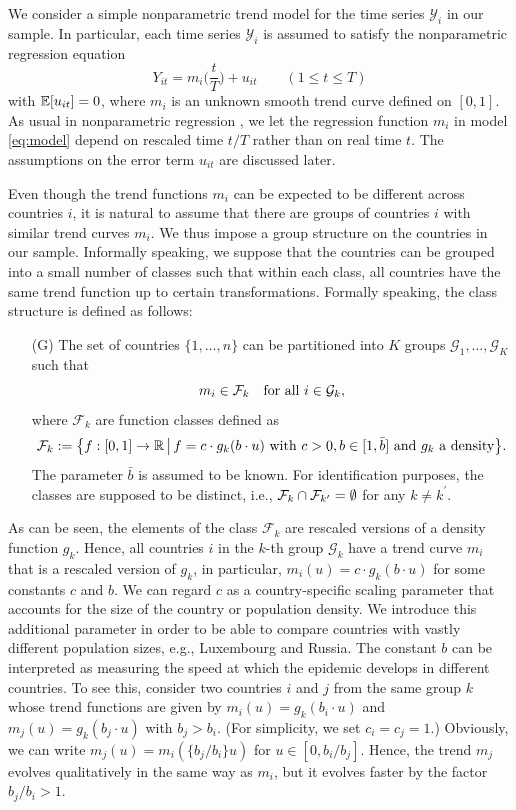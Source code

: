 \documentclass[a4paper,12pt]{article}
\numberwithin{equation}{section}
\begin{document}
We consider a simple nonparametric trend model for the time series $\mathcal{Y}_i$ in our sample. In particular, each time series $\mathcal{Y}_i$ is assumed to satisfy the nonparametric regression equation
\begin{equation}\label{eq:model}
Y_{it} = m_i\Big(\frac{t}{T}\Big) + u_{it} \qquad (1 \le t \le T) 
\end{equation}
with $\mathbb{E}[u_{it}]= 0$, where $m_i$ is an unknown smooth trend curve defined on $[0,1]$. As usual in nonparametric regression \citep[see e.g.][]{Robinson1989}, we let the regression function $m_i$ in model \eqref{eq:model} depend on rescaled time $t/T$ rather than on real time $t$. The assumptions on the error term $u_{it}$ are discussed later. 


Even though the trend functions $m_i$ can be expected to be different across countries $i$, it is natural to assume that there are groups of countries $i$ with similar trend curves $m_i$. We thus impose a group structure on the countries in our sample. Informally speaking, we suppose that the countries can be grouped into a small number of classes such that within each class, all countries have the same trend function up to certain transformations. Formally speaking, the class structure is defined as follows: 
\begin{enumerate}[leftmargin=0.8cm]
\item[(G)] The set of countries $\{1,\ldots,n\}$ can be partitioned into $K$ groups $\mathcal{G}_1,\ldots,\mathcal{G}_K$ such that 
\[ m_i \in \mathcal{F}_k \quad \text{for all } i \in \mathcal{G}_k, \]
where $\mathcal{F}_k$ are function classes defined as
\[ \mathcal{F}_k := \big\{ f:[0, 1] \rightarrow \mathbb{R} \,\big|\, f = c \cdot g_k(b \cdot u) \text{ with } c > 0, b \in [1, \bar{b}] \text{ and } g_k \text{ a density} \big\}. \]
The parameter $\bar{b}$ is assumed to be known. For identification purposes, the classes are supposed to be distinct, i.e., $\mathcal{F}_k \cap \mathcal{F}_{k^\prime} = \emptyset$ for any $k \neq k^\prime$. 
\end{enumerate}
As can be seen, the elements of the class $\mathcal{F}_k$ are rescaled versions of a density function $g_k$. Hence, all countries $i$ in the $k$-th group $\mathcal{G}_k$ have a trend curve $m_i$ that is a rescaled version of $g_k$, in particular, $m_i(u) = c \cdot g_k(b \cdot u)$ for some constants $c$ and $b$. We can regard $c$ as a country-specific scaling parameter that accounts for the size of the country or population density. We introduce this additional parameter in order to be able to compare countries with vastly different population sizes, e.g., Luxembourg and Russia. The constant $b$ can be interpreted as measuring the speed at which the epidemic develops in different countries. To see this, consider two countries $i$ and $j$ from the same group $k$ whose trend functions are given by $m_i(u) = g_k(b_i \cdot u)$ and $m_j(u) = g_k(b_j \cdot u)$ with $b_j > b_i$. (For simplicity, we set $c_i = c_j = 1$.) Obviously, we can write $m_j(u) = m_i(\{b_j/b_i\} u)$ for $u \in [0,b_i/b_j]$. Hence, the trend $m_j$ evolves qualitatively in the same way as $m_i$, but it evolves faster by the factor $b_j/b_i > 1$. 
\end{document}
